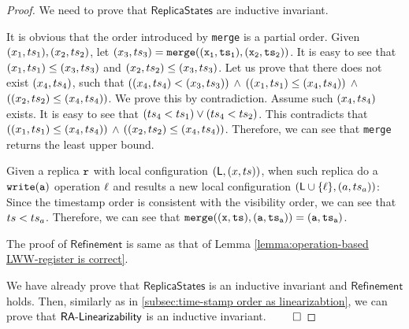 \begin {proof}

We need to prove that $\mathsf{ReplicaStates}$ are inductive invariant.

It is obvious that the order introduced by {\tt merge} is a partial order. Given $(x_1,ts_1), (x_2,ts_2)$, let $(x_3,\ats_3) = \alabelshort[{\tt merge}]{ (x_1,\ats_1), (x_2,\ats_2) }$. It is easy to see that $(x_1,ts_1) \leq (x_3,ts_3)$ and $(x_2,ts_2) \leq (x_3,ts_3)$. Let us prove that there does not exist $(x_4,ts_4)$, such that $( (x_4,ts_4)<(x_3,ts_3) )$ $\wedge$ $((x_1,ts_1) \leq (x_4,ts_4))$ $\wedge$ $((x_2,ts_2) \leq (x_4,ts_4))$. We prove this by contradiction. Assume such $(x_4,ts_4)$ exists. It is easy to see that $(ts_4 < ts_1) \vee (ts_4 < ts_2)$. This contradicts that $((x_1,ts_1) \leq (x_4,ts_4))$ $\wedge$ $((x_2,ts_2) \leq (x_4,ts_4))$. Therefore, we can see that {\tt merge} returns the least upper bound.

Given a replica $\mathtt{r}$ with local configuration $(\mathsf{L},(x,ts))$, when such replica do a $\alabelshort[{\tt write}]{a}$ operation $\ell$ and results a new local configuration $(\mathsf{L} \cup \{ \ell \},(a,ts_a))$: Since the timestamp order is consistent with the visibility order, we can see that $ts < ts_a$. Therefore, we can see that $ \alabelshort[{\tt merge}]{ (x,\ats), (a,\ats_a) } = (a,\ats_a)$.

The proof of $\mathsf{Refinement}$ is same as that of Lemma \ref{lemma:operation-based LWW-register is correct}.

We have already prove that $\mathsf{ReplicaStates}$ is an inductive invariant and $\mathsf{Refinement}$ holds. Then, similarly as in \sectionautorefname \ref{subsec:time-stamp order as linearizabtion}, we can prove that $\mathsf{RA\text{-}Linearizability{}}$ is an inductive invariant. $\qed$
\end {proof}




























